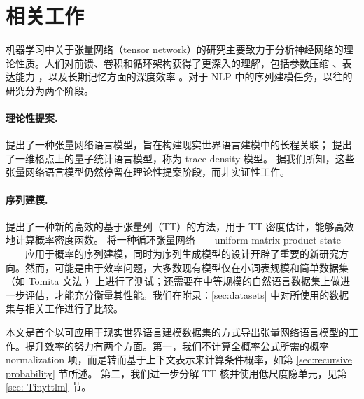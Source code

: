 \section{相关工作}

机器学习中关于张量网络（tensor network）的研究主要致力于分析神经网络的理论性质。人们对前馈、卷积和循环架构获得了更深入的理解，包括参数压缩 \citep{novikov2015tensorizing}、表达能力 \citep{cohen2016expressive, cohen2016convolutional, khrulkov2018expressive}，以及长期记忆方面的深度效率 \citep{levine2018benefits}。对于 NLP 中的序列建模任务，以往的研究分为两个阶段。

\paragraph{理论性提案.}
\citep{pestun2017tensor} 提出了一种张量网络语言模型，旨在构建现实世界语言建模中的长程关联；\citep{pestun2017language} 提出了一维格点上的量子统计语言模型，称为 trace-density 模型。
据我们所知，这些张量网络语言模型仍然停留在理论性提案阶段，而非实证性工作。


\paragraph{序列建模.} \cite{novikov2021tensor} 提出了一种新的高效的基于张量列（TT）的方法，用于 TT 密度估计，能够高效地计算概率密度函数。\cite{miller2021tensor} 将一种循环张量网络——uniform matrix product state——应用于概率的序列建模，同时为序列生成模型的设计开辟了重要的新研究方向。然而，可能是由于效率问题，大多数现有模型仅在小词表规模和简单数据集（如 Tomita 文法 \citep{tomita1982dynamic}）上进行了测试；还需要在中等规模的自然语言数据集上做进一步评估，才能充分衡量其性能。我们在附录：\ref{sec:datasets} 中对所使用的数据集与相关工作进行了比较。

本文是首个以可应用于现实世界语言建模数据集的方式导出张量网络语言模型的工作。提升效率的努力有两个方面。第一，我们不计算全概率公式所需的概率 normalization 项，而是转而基于上下文表示来计算条件概率，如第 \ref{sec:recursive probability} 节所述。
第二，我们进一步分解 TT 核并使用低尺度隐单元，见第 \ref{sec: Tinyttlm} 节。



